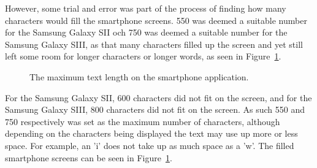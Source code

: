 However, some trial and error was part of the process of finding how many characters would fill the smartphone screens. 550 was deemed a suitable number for the Samsung Galaxy SII och 750 was deemed a suitable number for the Samsung Galaxy SIII, as that many characters filled up the screen and yet still left some room for longer characters or longer words, as seen in Figure~\ref{glassTestTextLengthRaw}. 

	\begin{figure}[H]%
		\centering
   		 \qquad
   		 \qquad
		\caption{The maximum text length on the smartphone application.}
		\label{glassTestTextLengthRaw}
	\end{figure}

For the Samsung Galaxy SII, 600 characters did not fit on the screen, and for the Samsung Galaxy SIII, 800 characters did not fit on the screen. As such 550 and 750 respectively was set as the maximum number of characters, although depending on the characters being displayed the text may use up more or less space. For example, an 'i' does not take up as much space as a 'w'. The filled smartphone screens can be seen in Figure~\ref{glassTestTextLengthRaw}.

